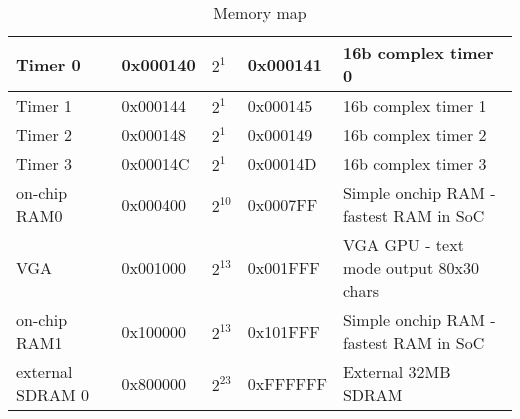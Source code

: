 \begin{table}[h]
\begin{tabular}{|l|l|l|l|l|}
        Timer 0             & 0x000140      & $2^{1}$       & 0x000141     & 16b complex timer 0                            \\ \hline
        Timer 1             & 0x000144      & $2^{1}$       & 0x000145     & 16b complex timer 1                            \\ \hline
        Timer 2             & 0x000148      & $2^{1}$       & 0x000149     & 16b complex timer 2                            \\ \hline
        Timer 3             & 0x00014C      & $2^{1}$       & 0x00014D     & 16b complex timer 3                            \\ \hline
        on-chip RAM0        & 0x000400      & $2^{10}$      & 0x0007FF     & Simple onchip RAM - fastest RAM in SoC         \\ \hline
        VGA                 & 0x001000      & $2^{13}$      & 0x001FFF     & VGA GPU - text mode output 80x30 chars         \\ \hline
        on-chip RAM1        & 0x100000      & $2^{13}$      & 0x101FFF     & Simple onchip RAM - fastest RAM in SoC         \\ \hline
        external SDRAM 0    & 0x800000      & $2^{23}$      & 0xFFFFFF     & External 32MB SDRAM                            \\ \hline
    \end{tabular}
    \caption{Memory map}
    \label{tab:memory_map}
\end{table}
